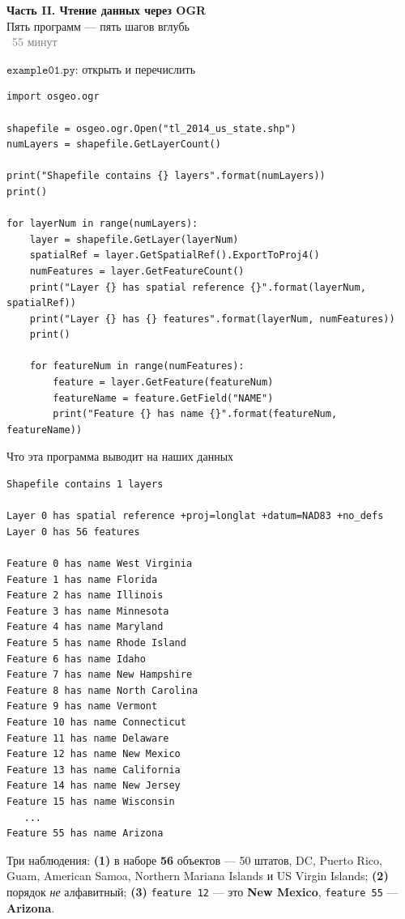 \documentclass[aspectratio=169,10pt]{beamer}
\newcommand{\num}[1]{\textcolor{codered}{\textbf{#1}}}
\begin{document}
\begin{frame}
  \begin{center}
    {\LARGE\bfseries Часть II. Чтение данных через OGR}\\[0.5em]
    {\large Пять программ --- пять шагов вглубь}\\[1.5em]
    {\small \textcolor{gray}{~55 минут}}
  \end{center}
\end{frame}

\begin{frame}[fragile]{$\texttt{example01.py}$: открыть и перечислить}
\begin{Verbatim}
import osgeo.ogr

shapefile = osgeo.ogr.Open("tl_2014_us_state.shp")
numLayers = shapefile.GetLayerCount()

print("Shapefile contains {} layers".format(numLayers))
print()

for layerNum in range(numLayers):
    layer = shapefile.GetLayer(layerNum)
    spatialRef = layer.GetSpatialRef().ExportToProj4()
    numFeatures = layer.GetFeatureCount()
    print("Layer {} has spatial reference {}".format(layerNum, spatialRef))
    print("Layer {} has {} features".format(layerNum, numFeatures))
    print()

    for featureNum in range(numFeatures):
        feature = layer.GetFeature(featureNum)
        featureName = feature.GetField("NAME")
        print("Feature {} has name {}".format(featureNum, featureName))
\end{Verbatim}
\end{frame}

\begin{frame}[fragile]{Что эта программа выводит на наших данных}
\begin{Verbatim}[numbers=none,fontsize=\scriptsize]
Shapefile contains 1 layers

Layer 0 has spatial reference +proj=longlat +datum=NAD83 +no_defs
Layer 0 has 56 features

Feature 0 has name West Virginia
Feature 1 has name Florida
Feature 2 has name Illinois
Feature 3 has name Minnesota
Feature 4 has name Maryland
Feature 5 has name Rhode Island
Feature 6 has name Idaho
Feature 7 has name New Hampshire
Feature 8 has name North Carolina
Feature 9 has name Vermont
Feature 10 has name Connecticut
Feature 11 has name Delaware
Feature 12 has name New Mexico
Feature 13 has name California
Feature 14 has name New Jersey
Feature 15 has name Wisconsin
   ...
Feature 55 has name Arizona
\end{Verbatim}
\vspace{0.2em}
{\footnotesize Три наблюдения: \textbf{(1)} в наборе \num{56} объектов ---
50 штатов, DC, Puerto Rico, Guam, American Samoa, Northern Mariana
Islands и US Virgin Islands; \textbf{(2)} порядок \emph{не} алфавитный;
\textbf{(3)} \texttt{feature 12} --- это \textbf{New Mexico},
\texttt{feature 55} --- \textbf{Arizona}.}
\end{frame}
\end{document}

